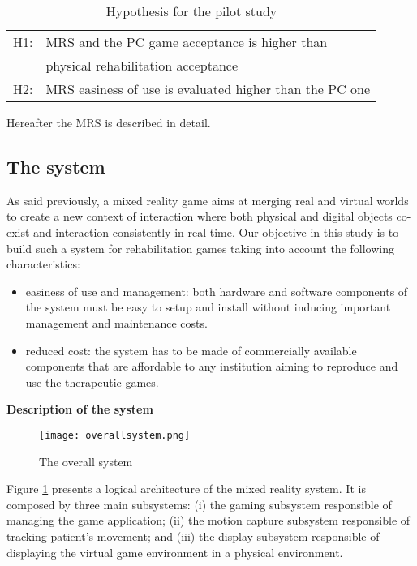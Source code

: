\documentclass[preprint,authoryear,12pt]{elsarticle}
\begin{document}
\begin{table}[h]
\caption{Hypothesis for the pilot study}
\center
\label{tab:ipotesi}
\begin{tabular}{|l|l|}
\hline
H1: & MRS and the PC game acceptance is higher than \\& physical rehabilitation acceptance \\
\hline
H2: & MRS easiness of use is evaluated higher than the PC one \\
\hline
\end{tabular}
\end{table}

Hereafter the MRS is described in detail. 

\subsection{The system}
\label{sytems}
As said previously, a mixed reality game aims at merging real and virtual worlds to create a new context of interaction where both physical and digital objects co-exist and interaction consistently in real time. Our objective in this study is to build such a system for rehabilitation games taking into account the following characteristics:
\begin{itemize}
\item easiness of use and management: both hardware and software components of the system must be easy to setup and install without inducing important management and maintenance costs.
\item reduced cost: the system has to be made of commercially available components that are affordable to any institution aiming to reproduce and use the therapeutic games.
\end{itemize}
\par\medskip
\textbf{Description of the system}

\begin{figure}[h]
	\centering
		\texttt{[image: overallsystem.png]}
	\caption{The overall system}
	\label{fig:overallsystem}
\end{figure}


Figure \ref{fig:overallsystem} presents a logical architecture of the mixed reality system. It is composed by three main subsystems: (i) the gaming subsystem responsible of managing the game application; (ii) the motion capture subsystem responsible of tracking patient's movement; and (iii) the display subsystem responsible of displaying the virtual game environment in a physical environment.
\end{document}
